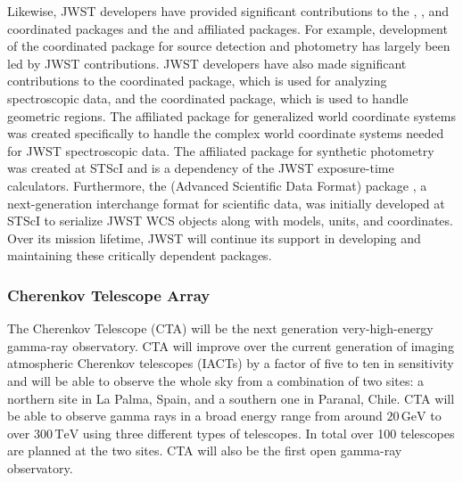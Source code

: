 \documentclass[modern]{aastex631}
\newcommand{\secauthor}[1]{{\color{blue}Author:~\textit{#1}}}
\newcommand{\secunfilled}{{\color{red}Author:~\textit{Looking for volunteers!}}}
\begin{document}
Likewise, JWST developers have provided significant contributions
to the  \citep{photutils}, 
\citep{specutils}, and  \citep{regions} coordinated
packages and the  \citep{gwcs} and 
\citep{synphot} affiliated packages. For example, development of the
 coordinated package for source detection and
photometry has largely been led by JWST contributions. JWST developers
have also made significant contributions to the 
coordinated package, which is used for analyzing spectroscopic data,
and the  coordinated package, which is used to
handle geometric regions. The  affiliated package for
generalized world coordinate systems was created specifically to handle
the complex world coordinate systems needed for JWST spectroscopic
data. The  affiliated package for synthetic photometry
was created at STScI and is a dependency of the JWST exposure-time
calculators. Furthermore, the  (Advanced Scientific Data
Format) package \citep{ASDF}, a next-generation interchange format for
scientific data, was initially developed at STScI to serialize JWST WCS
objects along with \astropypkg models, units, and coordinates. Over
its mission lifetime, JWST will continue its support in developing and
maintaining these critically dependent packages.



\subsubsection{Cherenkov Telescope Array}

The Cherenkov Telescope (CTA) will be the next generation very-high-energy
gamma-ray observatory.
CTA will improve over the current generation of imaging atmospheric Cherenkov telescopes (IACTs)
by a factor of five to ten in sensitivity and will be able to observe the whole sky from a combination of two sites:
a northern site in La Palma, Spain, and a southern one in Paranal, Chile.
CTA will be able to observe gamma rays in a broad energy range from around $20\,\mathrm{GeV}$ to over $300\,\mathrm{TeV}$
using three different types of telescopes. In total over 100 telescopes are planned at the two sites.
CTA will also be the first open gamma-ray observatory.
\end{document}
